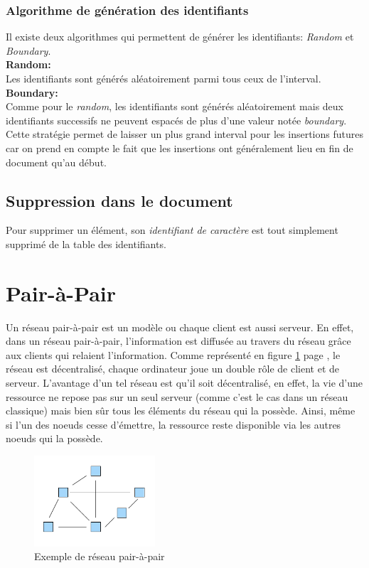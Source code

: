 		\subsubsection*{Algorithme de génération des
		identifiants}\label{sec:algos}
		Il existe deux algorithmes qui permettent de générer les identifiants:
		\emph{Random} et \emph{Boundary}.\\
		
		\textbf{Random:}\\
			Les identifiants sont générés aléatoirement parmi tous ceux de
			l'interval.\\
		
		\textbf{Boundary:}\\
			Comme pour le \emph{random}, les identifiants sont générés
			aléatoirement mais deux identifiants successifs ne peuvent espacés
			de plus d'une valeur notée \emph{boundary}. Cette stratégie permet
			de laisser un plus grand interval pour les insertions futures car on
			prend en compte le fait que les insertions ont généralement lieu en
			fin de document qu'au début.
		
	\subsection{Suppression dans le document}
		
		Pour supprimer un élément, son \emph{identifiant de caractère} est tout
		simplement supprimé de la table des identifiants.
		
\section{Pair-à-Pair}\label{sec:p2p}

	Un réseau pair-à-pair est un modèle ou chaque client est aussi serveur. En
	effet, dans un réseau pair-à-pair, l'information est diffusée au travers du
	réseau grâce aux clients qui relaient l'information. Comme représenté en
	figure \ref{fig:p2p} page \pageref{fig:p2p}, le réseau est décentralisé,
	chaque ordinateur joue un double rôle de client et de serveur. L'avantage
	d'un tel réseau est qu'il soit décentralisé, en effet, la vie d'une
	ressource ne repose pas sur un seul serveur (comme c'est le cas dans un
	réseau classique) mais bien sûr tous les éléments du réseau qui la possède.
	Ainsi, même si l'un des noeuds cesse d'émettre, la ressource reste
	disponible via les autres noeuds qui la possède.
	
	\begin{figure}
	  \center
      \includegraphics[width=0.4\textwidth]{includes/P2P-network.png}
      \caption{Exemple de réseau pair-à-pair}
      \label{fig:p2p}
    \end{figure}
	
